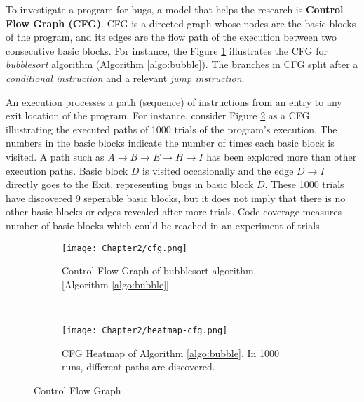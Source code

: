 To investigate a program for bugs, a model that helps the research is \textbf{Control Flow Graph (CFG)}. CFG is a directed graph whose nodes are the basic blocks of the program, and its edges are the flow path of the execution between two consecutive basic blocks. For instance, the Figure \ref{fig:cfg} illustrates the CFG for \textit{bubblesort} algorithm (Algorithm \ref{algo:bubble}). The branches in CFG split after a \textit{conditional instruction} and a relevant \textit{jump instruction}.



An execution processes a path (sequence) of instructions from an entry to any exit location of the program. For instance, consider Figure \ref{fig:cfg-heat} as a CFG illustrating the executed paths of 1000 trials of the program's execution. The numbers in the basic blocks indicate the number of times each basic block is visited. A path such as $A \rightarrow B \rightarrow E \rightarrow H \rightarrow I$ has been explored more than other execution paths. Basic block $D$ is visited occasionally and the edge $D \rightarrow I$ directly goes to the Exit, representing bugs in basic block $D$. These 1000 trials have discovered 9 seperable basic blocks, but it does not imply that there is no other basic blocks or edges revealed after more trials. Code coverage measures number of basic blocks which could be reached in an experiment of trials.

\begin{figure}[!t]
  \begin{adjustbox}{center,max width=1.3\textwidth}
    \begin{subfigure}[t]{0.35\textwidth}
      \centering
      \texttt{[image: Chapter2/cfg.png]}
      \vspace*{-5mm}
      \caption{Control Flow Graph of bubblesort algorithm [Algorithm \ref{algo:bubble}]}
      \label{fig:cfg}
      \vspace*{5mm}
    \end{subfigure}
    ~
    \hspace*{5mm}
    \begin{subfigure}[b]{0.35\textwidth}
      \centering
      \texttt{[image: Chapter2/heatmap-cfg.png]}
      \vspace*{-5mm}
      \caption{CFG Heatmap of Algorithm \ref{algo:bubble}. In 1000 runs, different paths are discovered.}
      \label{fig:cfg-heat}
      \vspace*{5mm}
    \end{subfigure}
  \end{adjustbox}
  \caption{Control Flow Graph}
  \label{fig:cfgs}
\end{figure}

